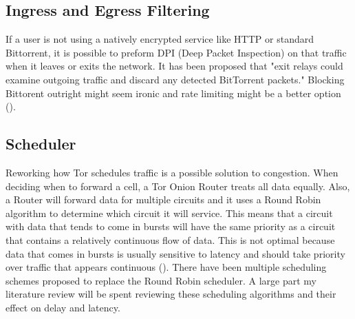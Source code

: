 \documentclass[letterpaper,13pt]{texMemo}
\begin{document}
    \subsection*{Ingress and Egress Filtering}
    If a user is not using a natively encrypted service like HTTP or standard Bittorrent, it is
    possible to preform DPI (Deep Packet Inspection) on that traffic when it leaves or exits the
    network. It has been proposed that "exit relays could examine outgoing traffic and discard any
    detected BitTorrent packets." Blocking Bittorent outright might seem ironic and rate limiting
    might be a better option (\citeauthor[2]{Moore}).

    \subsection*{Scheduler}
    Reworking how Tor schedules traffic is a possible solution to congestion. When deciding when to
    forward a cell, a Tor Onion Router treats all data equally. Also, a Router will forward data for
    multiple circuits and it uses a Round Robin algorithm to determine which circuit it will
    service. This means that a circuit with data that tends to come in bursts will have the same
    priority as a circuit that contains a relatively continuous flow of data. This is not optimal
    because data that comes in bursts is usually sensitive to latency and should take priority over
    traffic that appears continuous (\citeauthor[2]{unfair}). There have been multiple scheduling
    schemes proposed to replace the Round Robin scheduler. A large part my literature review will be
    spent reviewing these scheduling algorithms and their effect on delay and latency.
\end{document}
